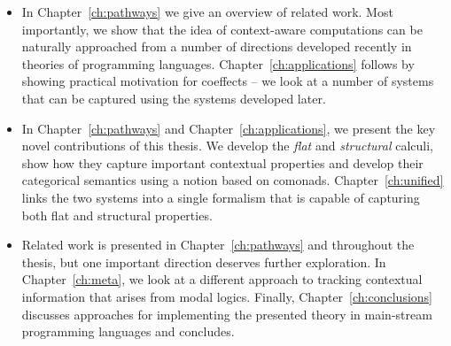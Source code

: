 \begin{itemize}
\item In Chapter~\ref{ch:pathways} we give an overview of related work. Most importantly, we show
  that the idea of context-aware computations can be naturally approached from a number of 
  directions developed recently in theories of programming languages. Chapter~\ref{ch:applications}
  follows by showing practical motivation for coeffects -- we look at a number of systems that 
  can be captured using the systems developed later.

\item In Chapter~\ref{ch:pathways} and Chapter~\ref{ch:applications}, we present the key novel
  contributions of this thesis. We develop the \emph{flat} and \emph{structural} calculi, show 
  how they capture important contextual properties and develop their categorical semantics using
  a notion based on comonads. Chapter~\ref{ch:unified} links the two systems into a single 
  formalism that is capable of capturing both flat and structural properties.

\item Related work is presented in Chapter~\ref{ch:pathways} and throughout the thesis, but 
  one important direction deserves further exploration. In Chapter~\ref{ch:meta}, we look at 
  a different approach to tracking contextual information that arises from modal logics. 
  Finally, Chapter~\ref{ch:conclusions} discusses approaches for implementing the presented theory
  in main-stream programming languages and concludes.
\end{itemize}

